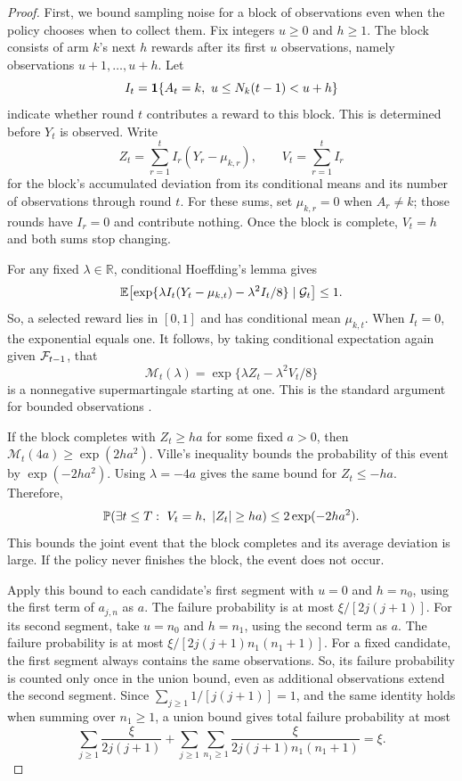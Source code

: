 \begin{proof}
First, we bound sampling noise for a block of observations even when
the policy chooses when to collect them.
Fix integers $u\geq0$ and $h\geq1$.
The block consists of arm $k$'s next $h$ rewards after its first $u$
observations, namely observations $u+1,\ldots,u+h$.
Let
\[
I_t=\mathbf 1\{A_t=k,\ u\leq N_k(t-1)<u+h\}
\]
indicate whether round $t$ contributes a reward to this block.
This is determined before $Y_t$ is observed.
Write
\[
Z_t=\sum_{r=1}^{t}I_r(Y_r-\mu_{k,r}),
\qquad
V_t=\sum_{r=1}^{t}I_r
\]
for the block's accumulated deviation from its conditional means
and its number of observations through round $t$.
For these sums, set $\mu_{k,r}=0$ when $A_r\ne k$; those rounds
have $I_r=0$ and contribute nothing.
Once the block is complete, $V_t=h$ and both sums stop changing.

For any fixed $\lambda\in\mathbb R$, conditional Hoeffding's lemma
gives
\[
\mathbb E\!\left[
\exp\{\lambda I_t(Y_t-\mu_{k,t})-\lambda^2I_t/8\}
\mid\mathcal G_t
\right]\leq1.
\]
So, a selected reward lies in $[0,1]$ and has conditional mean
$\mu_{k,t}$.
When $I_t=0$, the exponential equals one.
It follows, by taking conditional expectation again given $\mathcal F_{t-1}$,
that
\[
\mathcal M_t(\lambda)
=\exp\{\lambda Z_t-\lambda^2V_t/8\}
\]
is a nonnegative supermartingale starting at one.
This is the standard argument for bounded observations
\citep{howard2020timeuniform}.

If the block completes with $Z_t\geq ha$ for some fixed $a>0$,
then $\mathcal M_t(4a)\geq\exp(2ha^2)$.
Ville's inequality bounds the probability of this event by
$\exp(-2ha^2)$.
Using $\lambda=-4a$ gives the same bound for $Z_t\leq-ha$.
Therefore,
\begin{equation}
\Pp\!\left(\exists t\leq T:\ V_t=h,\ |Z_t|\geq ha\right)
\leq2\exp(-2ha^2).
\label{eq:adaptive-block-bound}
\end{equation}
This bounds the joint event that the block completes and its average
deviation is large.
If the policy never finishes the block, the event does not occur.

Apply this bound to each candidate's first segment with $u=0$ and
$h=n_0$, using the first term of $a_{j,n}$ as $a$.
The failure probability is at most $\xi/[2j(j+1)]$.
For its second segment, take $u=n_0$ and $h=n_1$, using the second
term as $a$.
The failure probability is at most
$\xi/[2j(j+1)n_1(n_1+1)]$.
For a fixed candidate, the first segment always contains the same observations.
So, its failure probability is counted only once in the union bound,
even as additional observations extend the second segment.
Since $\sum_{j\geq1}1/[j(j+1)]=1$, and the same identity holds
when summing over $n_1\geq1$, a union bound gives total failure
probability at most
\[
\sum_{j\geq1}\frac{\xi}{2j(j+1)}
+
\sum_{j\geq1}\sum_{n_1\geq1}
\frac{\xi}{2j(j+1)n_1(n_1+1)}
=\xi.
\]


\end{proof}
